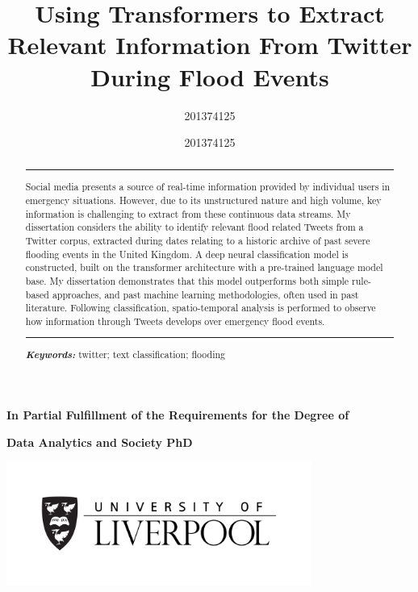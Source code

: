 \documentclass[a4paper, notitlepage]{extreport}
\title{Using Transformers to Extract Relevant Information From Twitter
During Flood Events}
\author{201374125}
\renewcommand*{\tableofcontents}{\listoftoc[{\contentsname}]{toc}}%
\providecommand{\keywords}[1]{\footnotesize\textbf{\textit{Keywords:}} #1}
\newcommand{\copyrightfont}{\linespread{1}\normalfont\rmfamily\fontsize{7}{8}\selectfont}
\begin{document}

    \maketitle

{\copyrightfont\author{201374125}}

\date{}
    \thispagestyle{empty}
    \vskip 50pt
  \begin{abstract}
      \centering\begin{minipage}{\dimexpr\paperwidth-10cm}
          \hrule
          \vskip 5pt
    Social media presents a source of real-time information provided by
    individual users in emergency situations. However, due to its
    unstructured nature and high volume, key information is challenging
    to extract from these continuous data streams. My dissertation
    considers the ability to identify relevant flood related Tweets from
    a Twitter corpus, extracted during dates relating to a historic
    archive of past severe flooding events in the United Kingdom. A deep
    neural classification model is constructed, built on the transformer
    architecture with a pre-trained language model base. My dissertation
    demonstrates that this model outperforms both simple rule-based
    approaches, and past machine learning methodologies, often used in
    past literature. Following classification, spatio-temporal analysis
    is performed to observe how information through Tweets develops over
    emergency flood events.
    \vskip 5pt
    \hrule
    \vskip 10pt
\keywords{twitter; text classification; flooding}
\end{minipage}
  \end{abstract}

\vskip 12pt

{\copyrightfont\centerline{\bfseries In Partial Fulfillment of the Requirements for the Degree of}}
{\copyrightfont\centerline{\bfseries Data Analytics and Society PhD}}
\centerline{\includegraphics[width = 100mm]{./template/uolLogo.png}}
\newpage

\tableofcontents
\end{document}
